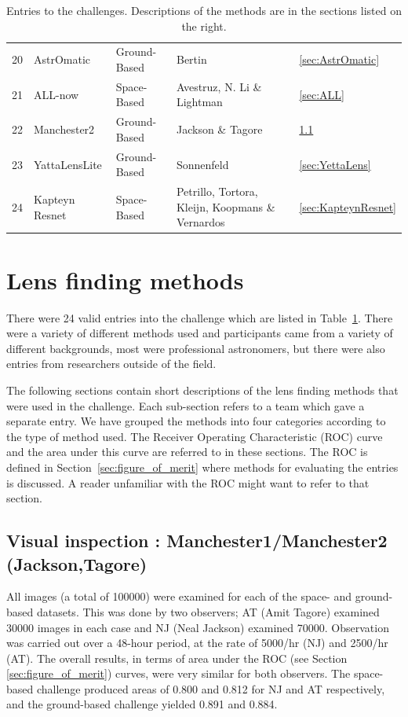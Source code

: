 \documentclass{aa}
\begin{document}
\begin{table}
\begin{tabular}{rllll}
  20 & AstrOmatic & Ground-Based & Bertin  & \ref{sec:AstrOmatic} \\ 
  21 & ALL-now & Space-Based & Avestruz, N. Li \& Lightman  & \ref{sec:ALL} \\ 
  22 & Manchester2 & Ground-Based & Jackson \& Tagore  & \ref{sec:manchester} \\ 
  23 & YattaLensLite & Ground-Based & Sonnenfeld  & \ref{sec:YettaLens} \\ 
  24 & Kapteyn Resnet & Space-Based & Petrillo, Tortora, Kleijn, Koopmans \& Vernardos & \ref{sec:KapteynResnet} \\ 
   \hline
\end{tabular}
\caption{Entries to the challenges.  Descriptions of the methods are in the sections listed on the right.}
\label{table:entries}
\end{table}

\section{Lens finding methods}
\label{sec:entries}

There were 24 valid entries into the challenge which are listed in Table~\ref{table:entries}.  There were a variety of different methods used and participants came from a variety of different backgrounds, most were professional astronomers, but there were also entries from researchers outside of the field.  

The following sections contain short descriptions of the lens finding methods that were used in 
the challenge.  Each sub-section refers to a team which gave a separate entry.  We have grouped the 
methods into four categories according to the type of method used.   The Receiver Operating Characteristic (ROC) curve and the area under this curve are referred to in these sections.  The ROC is defined in Section~\ref{sec:figure_of_merit} where methods for evaluating the entries is discussed.  A reader unfamiliar with the ROC might want to refer to that section.

\subsection{Visual inspection :  Manchester1/Manchester2 (Jackson,Tagore)}
\label{sec:manchester}

All images (a total of 100000) were examined for each of the space- and
ground-based datasets. This was done by two observers; AT (Amit Tagore) examined 30000
images in each case and NJ (Neal Jackson) examined 70000. Observation was carried out
over a 48-hour period, at the rate of 5000/hr (NJ) and 2500/hr (AT). 
The overall results, in terms of area under the ROC (see Section \ref{sec:figure_of_merit}) curves, were very similar for 
both observers. The space-based challenge produced areas of 0.800 and 
0.812 for NJ and AT respectively, and the ground-based challenge yielded 
0.891 and 0.884.
\end{document}
